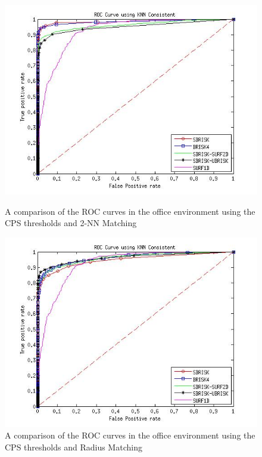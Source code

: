 \begin{figure}[ht!]
\begin{minipage}[b]{0.5\linewidth}
\includegraphics[scale=0.4]{../Drawings/dataset2_ROC_General_KNN_Consistent.jpg}
\caption{A comparison of the ROC curves in the office environment using the CPS thresholds and 2-NN Matching}
\label{fig:compareKnnConsistentOffice}
\end{minipage}
\hspace{0.5cm}
\begin{minipage}[b]{0.5\linewidth}
\includegraphics[scale=0.4]{../Drawings/dataset2_ROC_General_Hamming_Consistent.jpg}
\caption{A comparison of the ROC curves in the office environment using the CPS thresholds and Radius Matching}
\label{fig:compareHammingConsistentOffice}
\end{minipage}
\end{figure}

